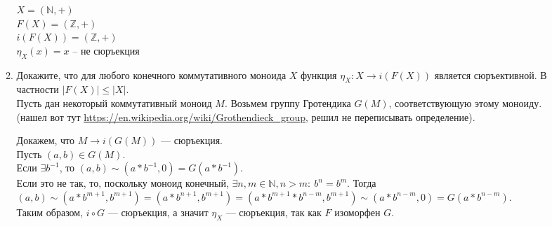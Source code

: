 \documentclass[draft]{article}
\begin{document}
\begin{enumerate}
\begin{enumerate}
$X = (\mathbb{N}, +)$\\
$F(X) = (\mathbb{Z}, +)$\\
$i(F(X)) = (\mathbb{Z}, +)$\\
$\eta_X(x) = x$ -- не сюръекция

\item Докажите, что для любого конечного коммутативного моноида $X$ функция $\eta_X : X \to i(F(X))$ является сюръективной. В частности $|F(X)| \leq |X|$.\\

Пусть дан некоторый коммутативный моноид $M$. Возьмем группу Гротендика $G(M)$, соответствующую этому моноиду.\\
(нашел вот тут \url{https://en.wikipedia.org/wiki/Grothendieck_group}, решил не переписывать определение).

Докажем, что $M \to i(G(M))$ --- сюръекция.\\
Пусть $(a, b) \in G(M)$. \\
Если $\exists b^{-1}$, то $(a, b) \sim (a*b^{-1}, 0) = G(a*b^{-1})$.\\
Если это не так, то, поскольку моноид конечный, $\exists n,m \in \mathbb{N}, n > m: ~b^n=b^m$. Тогда $(a, b) \sim (a*b^{m+1}, b^{m+1}) = (a*b^{n+1}, b^{m+1}) = (a*b^{m+1}*b^{n - m}, b^{m+1}) \sim (a*b^{n - m}, 0) = G(a*b^{n - m})$.\\

Таким образом, $i \circ G$ --- сюръекция, а значит $\eta_X$ --- сюръекция, так как $F$ изоморфен $G$.
\end{enumerate}

\end{enumerate}
\end{document}
